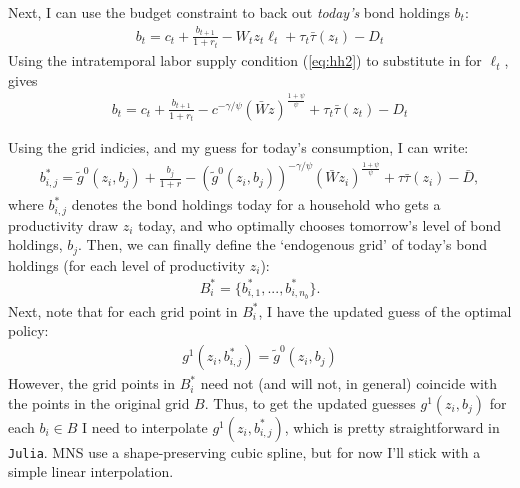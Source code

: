 \documentclass[12pt]{article}
\begin{document}
Next, I can use the budget constraint to back out \textit{today's} bond holdings $b_t$:
\begin{align*}
b_t = c_t + \frac{b_{t+1}}{1+r_t} -  W_tz_t\ell_t + \tau_t\bar\tau(z_t) - D_t
\end{align*}
Using the intratemporal labor supply condition (\ref{eq:hh2}) to substitute in for $\ell_t$, gives
\begin{align*}
b_t = c_t + \frac{b_{t+1}}{1+r_t} -  c^{-\gamma/\psi}(\bar Wz)^{\frac{1+\psi}{\psi}} + \tau_t\bar\tau(z_t) - D_t
\end{align*}

Using the grid indicies, and my guess for today's consumption, I can write:
\begin{align*}
b^*_{i,j} = \tilde g^0(z_i,b_j) + \frac{b_j}{1+r} - \left(\tilde g^0(z_i,b_j)\right)^{-\gamma/\psi} (\bar Wz_i)^{\frac{1+\psi}{\psi}} + \tau\bar\tau(z_i) - \bar D ,
\end{align*}
where $b^*_{i,j}$ denotes the bond holdings today for a household who gets a productivity draw $z_i$ today, and who optimally chooses tomorrow's level of bond holdings, $b_j$. Then, we can finally define the `endogenous grid' of today's bond holdings (for each level of productivity $z_i$):
\begin{align*}
B_i^* = \{ b^*_{i,1}, ... , b^*_{i,n_b}\}.
\end{align*}
Next, note that for each grid point in $B_i^*$, I have the updated guess of the optimal policy:
\begin{align*}
g^1(z_i,b^*_{i,j}) =  \tilde g^0(z_i,b_j)
\end{align*}
However, the grid points in $B_i^*$ need not (and will not, in general) coincide with the points in the original grid $B$. Thus, to get the updated guesses $g^1(z_i,b_j)$ for each $b_i \in B$ I need to interpolate $g^1(z_i,b^*_{i,j})$, which is pretty straightforward in \verb|Julia|. MNS use a shape-preserving cubic spline, but for now I'll stick with a simple linear interpolation.\\
\end{document}
